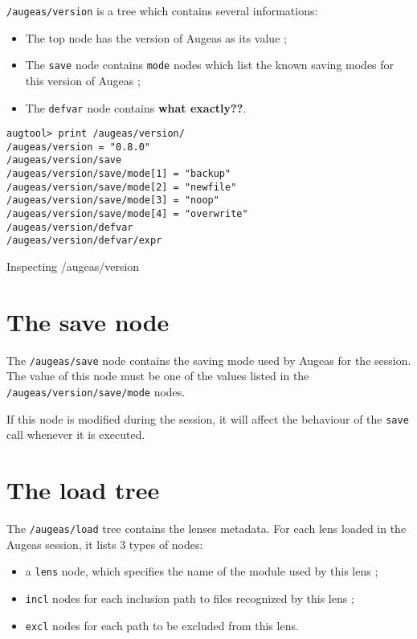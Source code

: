 \nolinkurl{/augeas/version} is a tree which contains several informations:

\begin{itemize}
\item
  The top node has the version of Augeas as its value ;
\item
  The \verb!save! node contains \verb!mode! nodes which list the known saving modes for this version of Augeas ;
\item
  The \verb!defvar! node contains \textbf{what exactly??}.
\end{itemize}


\begin{listing}
  \begin{verbatim}
augtool> print /augeas/version/
/augeas/version = "0.8.0"
/augeas/version/save
/augeas/version/save/mode[1] = "backup"
/augeas/version/save/mode[2] = "newfile"
/augeas/version/save/mode[3] = "noop"
/augeas/version/save/mode[4] = "overwrite"
/augeas/version/defvar
/augeas/version/defvar/expr
  \end{verbatim}
  \caption{Inspecting /augeas/version}
  \label{lst:metadata_version}
\end{listing}


\section{The save node}

\label{sec:save_node} 

The \nolinkurl{/augeas/save} node contains the saving mode used by Augeas for the session. The value of this node must be one of the values listed in the \nolinkurl{/augeas/version/save/mode} nodes.

If this node is modified during the session, it will affect the behaviour of the \verb!save! call whenever it is executed.

\section{The load tree}


The \nolinkurl{/augeas/load} tree contains the lenses metadata. For each lens loaded in the Augeas session, it lists 3 types of nodes:

\begin{itemize}
\item
  a \verb!lens! node, which specifies the name of the module used by this lens ;
\item
  \verb!incl! nodes for each inclusion path to files recognized by this lens ;
\item
  \verb!excl! nodes for each path to be excluded from this lens.
\end{itemize}

